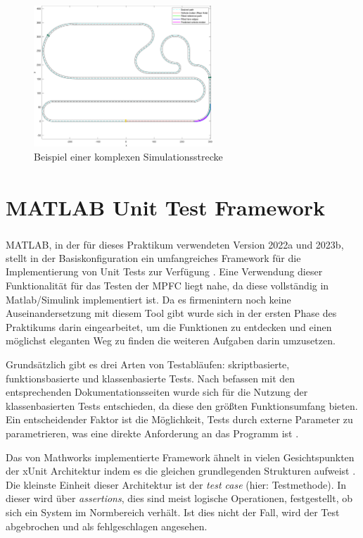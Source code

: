 
\begin{figure}
    \centering
    \includegraphics[width=0.6\textwidth]{figures/3_Implementierung/simulationsumgebung.pdf}
    \caption{Beispiel einer komplexen Simulationsstrecke}
    \label{fig:Simulation_Strecke}
\end{figure}

\section{MATLAB\textsuperscript{\textregistered} Unit Test Framework} \label{sec:MatlabUnitTest}

MATLAB\textsuperscript{\textregistered}, in der für dieses Praktikum verwendeten Version 2022a und 2023b, stellt in der Basiskonfiguration ein umfangreiches Framework für die Implementierung von Unit Tests zur Verfügung \cite{matlabTest}. Eine Verwendung dieser Funktionalität für das Testen der MPFC liegt nahe, da diese vollständig in Matlab/Simulink implementiert ist. Da es firmenintern noch keine Auseinandersetzung mit diesem Tool gibt wurde sich in der ersten Phase des Praktikums darin eingearbeitet, um die Funktionen zu entdecken und einen möglichst eleganten Weg zu finden die weiteren Aufgaben darin umzusetzen.

Grundsätzlich gibt es drei Arten von Testabläufen: skriptbasierte, funktionsbasierte und klassenbasierte Tests. Nach befassen mit den entsprechenden Dokumentationsseiten wurde sich für die Nutzung der klassenbasierten Tests entschieden, da diese den größten Funktionsumfang bieten. Ein entscheidender Faktor ist die Möglichkeit, Tests durch externe Parameter zu parametrieren, was eine direkte Anforderung an das Programm ist \cite{matlabTest}.

Das von Mathworks implementierte Framework ähnelt in vielen Gesichtspunkten der xUnit Architektur indem es die gleichen grundlegenden Strukturen aufweist \cite{xUnitWiki}. Die kleinste Einheit dieser Architektur ist der \textit{test case} (hier: Testmethode). In dieser wird über \textit{assertions}, dies sind meist logische Operationen, festgestellt, ob sich ein System im Normbereich verhält. Ist dies nicht der Fall, wird der Test abgebrochen und als fehlgeschlagen angesehen.

